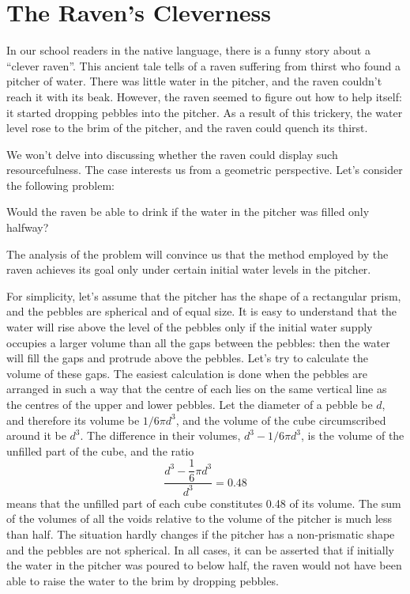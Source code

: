 \section{The Raven's Cleverness}
\label{sec-9.14}

In our school readers in the native language, there is a funny story about a ``clever raven''. This ancient tale tells of a raven suffering from thirst who found a pitcher of water. There was little water in the pitcher, and the raven couldn't reach it with its beak. However, the raven seemed to figure out how to help itself: it started dropping pebbles into the pitcher. As a result of this trickery, the water level rose to the brim of the pitcher, and the raven could quench its thirst.

We won't delve into discussing whether the raven could display such resourcefulness. The case interests us from a geometric perspective. Let's consider the following problem:

\ques Would the raven be able to drink if the water in the pitcher was filled only halfway?



\ans The analysis of the problem will convince us that the method employed by the raven achieves its goal only under certain initial water levels in the pitcher.

For simplicity, let's assume that the pitcher has the shape of a rectangular prism, and the pebbles are spherical and of equal size. It is easy to understand that the water will rise above the level of the pebbles only if the initial water supply occupies a larger volume than all the gaps between the pebbles: then the water will fill the gaps and protrude above the pebbles. Let's try to calculate the volume of these gaps. The easiest calculation is done when the pebbles are arranged in such a way that the centre of each lies on the same vertical line as the centres of the upper and lower pebbles. Let the diameter of a pebble be $d$, and therefore its volume be $1/6 \pi d^{3}$, and the volume of the cube circumscribed around it be $d^{3}$. The difference in their volumes, $d^{3} - 1/6 \pi d^{3}$, is the volume of the unfilled part of the cube, and the ratio 
\begin{equation*}%
\frac{d^{3} - \dfrac{1}{6} \pi d^{3}}{d^{3}} = 0.48
\end{equation*}
means that the unfilled part of each cube constitutes 0.48 of its volume. The sum of the volumes of all the voids relative to the volume of the pitcher is much less than half. The situation hardly changes if the pitcher has a non-prismatic shape and the pebbles are not spherical. In all cases, it can be asserted that if initially the water in the pitcher was poured to below half, the raven would not have been able to raise the water to the brim by dropping pebbles.

